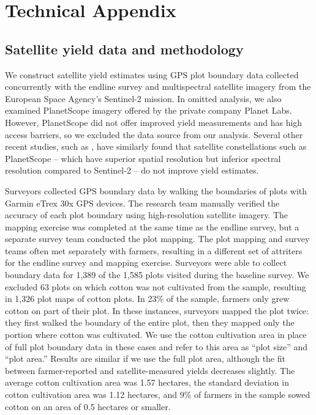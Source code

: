 \documentclass{article}
\begin{document}
\FloatBarrier

\clearpage
\pagebreak


\section{Technical Appendix} \label{technical-appendix}
\singlespace

\subsection{Satellite yield data and methodology}

We construct satellite yield estimates using GPS plot boundary data collected concurrently with the endline survey and multispectral satellite imagery from the European Space Agency’s Sentinel-2 mission. In omitted analysis, we also examined PlanetScope imagery offered by the private company Planet Labs. However, PlanetScope did not offer improved yield measurements and has high access barriers, so we excluded the data source from our analysis. Several other recent studies, such as \citet{Lobell2019SightMali}, have similarly found that satellite constellations such as PlanetScope – which have superior spatial resolution but inferior spectral resolution compared to Sentinel-2 – do not improve yield estimates. 

Surveyors collected GPS boundary data by walking the boundaries of plots with Garmin eTrex 30x GPS devices. The research team manually verified the accuracy of each plot boundary using high-resolution satellite imagery. The mapping exercise was completed at the same time as the endline survey, but a separate survey team conducted the plot mapping. The plot mapping and survey teams often met separately with farmers, resulting in a different set of attriters for the endline survey and mapping exercise. 
Surveyors were able to collect boundary data for 1,389 of the 1,585 plots visited during the baseline survey. We excluded 63 plots on which cotton was not cultivated from the sample, resulting in 1,326 plot maps of cotton plots. In 23\% of the sample, farmers only grew cotton on part of their plot. In these instances, surveyors mapped the plot twice: they first walked the boundary of the entire plot, then they mapped only the portion where cotton was cultivated. We use the cotton cultivation area in place of full plot boundary data in these cases and refer to this area as ``plot size'' and ``plot area.'' Results are similar if we use the full plot area, although the fit between farmer-reported and satellite-measured yields decreases slightly. The average cotton cultivation area was 1.57 hectares, the standard deviation in cotton cultivation area was 1.12 hectares, and 9\% of farmers in the sample sowed cotton on an area of 0.5 hectares or smaller. 
\end{document}
